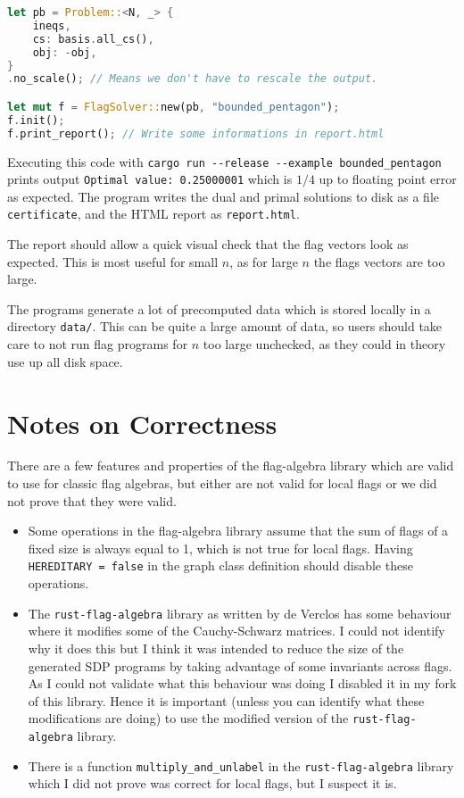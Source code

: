 \begin{lstlisting}[basicstyle=\scriptsize, language=rust]
let pb = Problem::<N, _> {
    ineqs,
    cs: basis.all_cs(),
    obj: -obj,
}
.no_scale(); // Means we don't have to rescale the output.

let mut f = FlagSolver::new(pb, "bounded_pentagon");
f.init();
f.print_report(); // Write some informations in report.html
\end{lstlisting}

Executing this code with \verb|cargo run --release --example bounded_pentagon|\\
prints output \verb|Optimal value: 0.25000001| which is $1/4$ up to floating point error
as expected. The program writes the dual and primal solutions to disk as a file
\verb|certificate|, and the HTML report as \verb|report.html|.

The report should allow a quick visual check that the flag vectors look as expected.
This is most useful for small $n$, as for large $n$ the flags vectors are too large.

\begin{note*}
    The programs generate a lot of precomputed data which is stored locally in a
    directory \verb|data/|. This can be quite a large amount of data, so users should
    take care to not run flag programs for $n$ too large unchecked, as they could in
    theory use up all disk space.
\end{note*}

\section*{Notes on Correctness}

There are a few features and properties of the flag-algebra library which are valid
to use for classic flag algebras, but either are not valid for local flags or
we did not prove that they were valid.
\begin{itemize}
    \item Some operations in the flag-algebra library assume that the sum of flags
        of a fixed size is always equal to 1, which is not true for local flags.
        Having\\
        \verb|HEREDITARY = false| in the graph class definition should disable
        these operations.
    \item The \verb|rust-flag-algebra| library as written by de Verclos has some behaviour where it
        modifies some of the Cauchy-Schwarz matrices. I could not identify why it does
        this but I think it was intended to reduce the size of the generated SDP
        programs by taking advantage of some invariants across flags. As I could not validate what
        this behaviour was doing I disabled it in my fork of this library. Hence it is important
        (unless you can identify what these modifications are doing) to use the modified
        version of the \verb|rust-flag-algebra| library.
    \item There is a function \verb|multiply_and_unlabel| in the \verb|rust-flag-algebra|
        library which I did not prove was correct for local flags, but I suspect it is.
\end{itemize}
